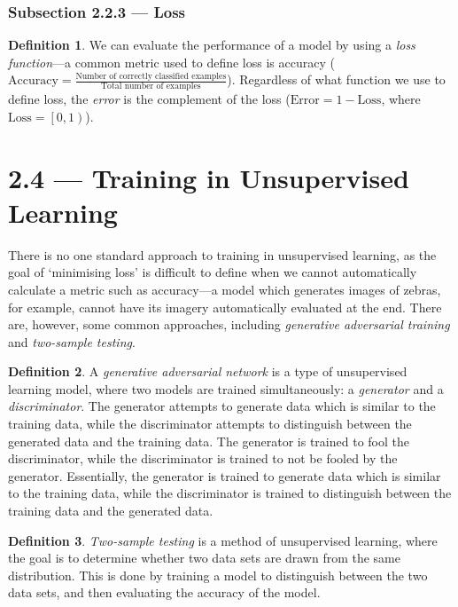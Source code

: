 \documentclass{article}
\theoremstyle{definition}
\newtheorem{definition}{Definition}[section]
\begin{document}
\subsubsection{Subsection 2.2.3 --- Loss}
\begin{definition}
    We can evaluate the performance of a model by using a \emph{loss function}---a common metric used to define loss is accuracy ($\mathrm{Accuracy} = \frac{\text{Number of correctly classified examples}}{\text{Total number of examples}}$). Regardless of what function we use to define loss, the \emph{error} is the complement of the loss ($\mathrm{Error} = 1 - \mathrm{Loss}$, where $\mathrm{Loss} = \left[0, 1\right)$).
\end{definition}

\section{2.4 --- Training in Unsupervised Learning}
There is no one standard approach to training in unsupervised learning, as the goal of `minimising loss' is difficult to define when we cannot automatically calculate a metric such as accuracy---a model which generates images of zebras, for example, cannot have its imagery automatically evaluated at the end. There are, however, some common approaches, including \emph{generative adversarial
training} and \emph{two-sample testing}.
\begin{definition}
    A \emph{generative adversarial network} is a type of unsupervised learning model, where two models are trained simultaneously: a \emph{generator} and a \emph{discriminator}. The generator attempts to generate data which is similar to the training data, while the discriminator attempts to distinguish between the generated data and the training data. The generator is trained to fool the discriminator, while the discriminator is trained to not be fooled by the generator. Essentially, the generator is trained to generate data which is similar to the training data, while the discriminator is trained to distinguish between the training data and the generated data.
\end{definition}
\begin{definition}
    \emph{Two-sample testing} is a method of unsupervised learning, where the goal is to determine whether two data sets are drawn from the same distribution. This is done by training a model to distinguish between the two data sets, and then evaluating the accuracy of the model.
\end{definition}
\end{document}
